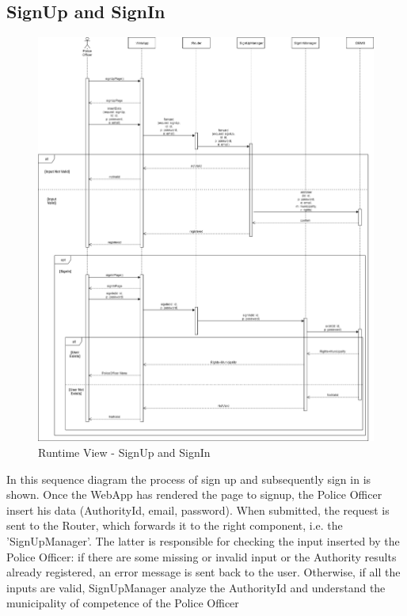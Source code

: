         \subsection{SignUp and SignIn}
        \begin{figure}[H]
            \includegraphics[scale=0.35]{dd/resources/images/RuntimeView-SignUp+SignIn}
            \caption{Runtime View - SignUp and SignIn}        
        \end{figure}
        In this sequence diagram the process of sign up and subsequently sign in is shown. 
        Once the WebApp has rendered the page to signup, the Police Officer insert his data 
        (AuthorityId, email, password). When submitted, the request is sent to the Router, 
        which forwards it to the right component, i.e. the 'SignUpManager'. The latter is 
        responsible for checking the input inserted by the Police Officer: if there are some 
        missing or invalid input or the Authority results already registered, an error message 
        is sent back to the user. Otherwise, if all the inputs are valid, SignUpManager analyze 
        the AuthorityId and understand the municipality of competence of the Police Officer 
